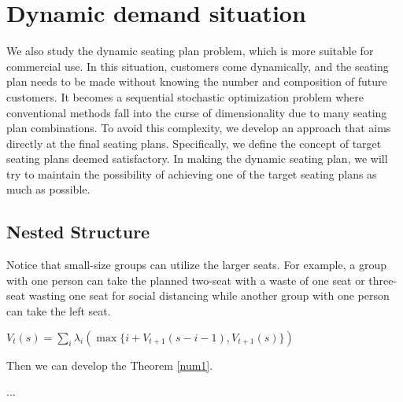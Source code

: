 \section{Dynamic demand situation}

We also study the dynamic seating plan problem, which is more suitable for commercial use. In this situation, customers come dynamically, and the seating plan needs to be made without knowing the number and composition of future customers. It becomes a sequential stochastic optimization problem where conventional methods fall into the curse of dimensionality due to many seating plan combinations. To avoid this complexity, we develop an approach that aims directly at the final seating plans. Specifically, we define the concept of target seating plans deemed satisfactory. In making the dynamic seating plan, we will try to maintain the possibility of achieving one of the target seating plans as much as possible.

\subsection{Nested Structure}\label{section-nested}
Notice that small-size groups can utilize the larger seats. For example, a group with one person can take the planned two-seat with a waste of one seat or three-seat wasting one seat for social distancing while another group with one person can take the left seat.


$V_t(s) = \sum_i \lambda_i (\max\{i+V_{t+1}(s-i-1), V_{t+1}(s)\})$


Then we can develop the Theorem \ref{num1}.

\begin{thm}\label{num1}
...
\end{thm}

\newpage

